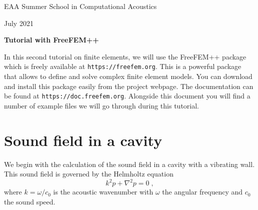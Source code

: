 \documentclass[english,3p]{elsarticle}
\begin{document}
\begin{center}
EAA Summer School in Computational Acoustics

July 2021
\vspace{5mm}

\textbf{\large Tutorial with FreeFEM++}
\end{center}

\vspace{10mm}

In this second tutorial on finite elements, we will use the FreeFEM++ package which is freely available at \texttt{https://freefem.org}.
This is a powerful package that allows to define and solve complex finite element models.
You can download and install this package easily from the project webpage.
The documentation can be found at \texttt{https://doc.freefem.org}.
Alongside this document you will find a number of example files we will go through during this tutorial.


\section{Sound field in a cavity}

We begin with the calculation of the sound field in a cavity with a vibrating wall.
This sound field is governed by the Helmholtz equation
\begin{equation}
k^2p + \nabla^2 p = 0
\;,
\label{eq:helmholtz}
\end{equation}
where $k=\omega/c_0$ is the acoustic wavenumber with $\omega$ the angular frequency and $c_0$ the sound speed.
\end{document}

